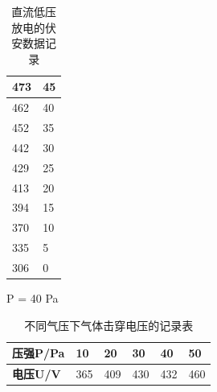 \documentclass[a4paper,UTF8]{ctexart}
\begin{document}
\begin{table}[H]
\begin{subtable}[h]{0.45\textwidth}
\begin{tabular}{| l | l|}
        473 & 45 \\ \hline
        462 & 40 \\ \hline
        452 & 35 \\ \hline
        442 & 30 \\ \hline
        429 & 25 \\ \hline
        413 & 20 \\ \hline
        394 & 15 \\ \hline
        370 & 10 \\ \hline
        335 & 5 \\ \hline
        306 & 0 \\ \hline
        \end{tabular}
        \caption{P = 40 Pa}
        \label{tab:p40}
     \end{subtable}
     \caption{直流低压放电的伏安数据记录}
     \label{tab:temps}
\end{table}

\begin{table}[H]
    \centering
    \begin{tabular}{|l|l|l|l|l|l|}
    \hline
        \textbf{压强P/Pa} & 10 & 20 & 30 & 40 & 50 \\ \hline
        \textbf{电压U/V} & 365 & 409 & 430 & 432 & 460 \\ \hline
    \end{tabular}
    \caption{不同气压下气体击穿电压的记录表}
\end{table}
\end{document}
